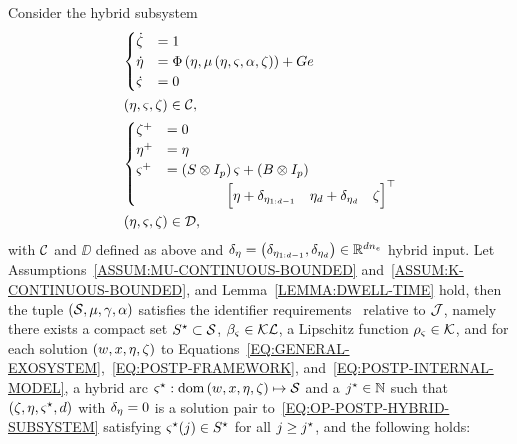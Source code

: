 \begin{lemma}
   Consider the hybrid subsystem
   \begin{equation}%
      \label{EQ:OP-POSTP-HYBRID-SUBSYSTEM}
      \begin{split}
         &
         \begin{cases}
            \dot{\clock} & = 1 \\
            \dot{\im} & = \imfun \lp \im, \pmu \lp \im, \id, \alpha, \clock \rp \rp + Ge \\
            \dot{\id} & = 0 \\
         \end{cases} \\
         & \lp \im, \id, \clock \rp \in \CC, \\
         &
         \begin{cases}
            \clock^{+} & = 0 \\
            \im^{+} & = \im \\
            \id^{+} & = \lp S \otimes I_{p}\rp \id + \lp B \otimes I_{p}\rp \\ 
            & \hspace{1.5cm} \begin{bmatrix} \im+\delta_{\im_{1:d-1}} & \im_d+\delta_{\im_d} & \clock \end{bmatrix}\T \\
         \end{cases} \\
         & \lp \im, \id, \clock \rp \in \DD, \\
      \end{split}
   \end{equation}
   with $\mathcal{C}$ and $\DD$ defined as above and $\delta_{\eta} = \left( \delta_{\eta_{1:d-1}}, \delta_{\eta_d} \right) \in \mathbb{R}^{dn_{e}}$ hybrid input.
   Let Assumptions~\ref{ASSUM:MU-CONTINUOUS-BOUNDED} and~\ref{ASSUM:K-CONTINUOUS-BOUNDED}, and Lemma~\ref{LEMMA:DWELL-TIME} hold, then the tuple $\left( \mathcal{S}, \mu, \gamma, \alpha\right)$
   satisfies the identifier requirements~\cite{bin2020approximate} relative to $\mathcal{J}$, namely there exists a compact set $S^{\star} \subset \mathcal{S}$, $\beta_{\varsigma} \in \mathcal{KL}$,
   a Lipschitz function $\rho_{\varsigma} \in \mathcal{K}$, and for each solution $\left( w, x, \eta, \zeta \right)$ to
   Equations~\eqref{EQ:GENERAL-EXOSYSTEM},~\eqref{EQ:POSTP-FRAMEWORK}, and~\eqref{EQ:POSTP-INTERNAL-MODEL},
   a hybrid arc $\varsigma^{\star}: \text{dom}\left( w, x, \eta, \zeta\right) \mapsto \mathcal{S}$ and a $j^{\star} \in \mathbb{N}$ such that $\left( \zeta, \eta, \varsigma^{\star}, d \right)$ with $\delta_{\eta} = 0$
   is a solution pair to~\eqref{EQ:OP-POSTP-HYBRID-SUBSYSTEM} satisfying $\varsigma^{\star}(j) \in S^{\star}$ for all $j \ge j^{\star}$, and the following holds:

\end{lemma}
